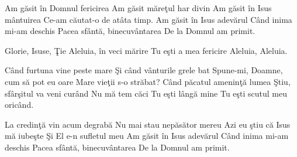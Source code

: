 
\beginverse
Am găsit în Domnul fericirea
Am găsit măreţul har divin
Am găsit în Isus mântuirea
Ce-am căutat-o de atâta timp.
Am găsit în Isus adevărul
Când inima mi-am deschis
Pacea sfântă, binecuvântarea
De la Domnul am primit.
\endverse

\beginchorus
Glorie, Isuse, Ţie
Aleluia, în veci mărire
Tu eşti a mea fericire
Aleluia, Aleluia.
\endchorus

\beginverse
Când furtuna vine peste mare
Şi când vânturile grele bat
Spune-mi, Doamne, cum să pot eu oare
Mare vieţii s-o străbat?
Când păcatul ameninţă lumea
Ştiu, sfârşitul va veni curând
Nu mă tem căci Tu eşti lângă mine
Tu eşti scutul meu oricând.
\endverse

\beginverse
La credinţă vin acum degrabă
Nu mai stau nepăsător mereu
Azi eu ştiu că Isus mă iubeşte
Şi El e-n sufletul meu
Am găsit în Isus adevărul
Când inima mi-am deschis
Pacea sfântă, binecuvântarea
De la Domnul am primit.
\endverse

\endsong